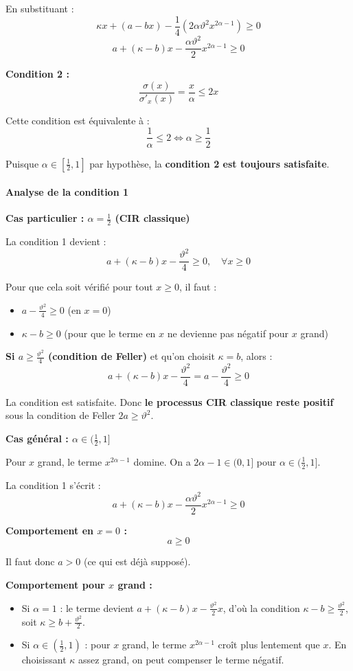 \documentclass[12pt,a4paper]{article}
\theoremstyle{definition}
\theoremstyle{remark}
\begin{document}
En substituant :
\[
\kappa x + (a - bx) - \frac{1}{4}(2\alpha\vartheta^2 x^{2\alpha-1}) \geq 0
\]
\[
a + (\kappa - b)x - \frac{\alpha\vartheta^2}{2}x^{2\alpha-1} \geq 0
\]

\textbf{Condition 2 :}
\[
\frac{\sigma(x)}{\sigma'_x(x)} = \frac{x}{\alpha} \leq 2x
\]

Cette condition est équivalente à :
\[
\frac{1}{\alpha} \leq 2 \iff \alpha \geq \frac{1}{2}
\]

Puisque $\alpha \in [\frac{1}{2}, 1]$ par hypothèse, la \textbf{condition 2 est toujours satisfaite}.

\paragraph{Analyse de la condition 1}

\textbf{Cas particulier : $\alpha = \frac{1}{2}$ (CIR classique)}

La condition 1 devient :
\[
a + (\kappa - b)x - \frac{\vartheta^2}{4} \geq 0, \quad \forall x \geq 0
\]

Pour que cela soit vérifié pour tout $x \geq 0$, il faut :
\begin{itemize}
\item $a - \frac{\vartheta^2}{4} \geq 0$ (en $x = 0$)
\item $\kappa - b \geq 0$ (pour que le terme en $x$ ne devienne pas négatif pour $x$ grand)
\end{itemize}

\textbf{Si $a \geq \frac{\vartheta^2}{4}$ (condition de Feller)} et qu'on choisit $\kappa = b$, alors :
\[
a + (\kappa - b)x - \frac{\vartheta^2}{4} = a - \frac{\vartheta^2}{4} \geq 0
\]

La condition est satisfaite. Donc \textbf{le processus CIR classique reste positif} sous la condition de Feller $2a \geq \vartheta^2$.

\textbf{Cas général : $\alpha \in (\frac{1}{2}, 1]$}

Pour $x$ grand, le terme $x^{2\alpha-1}$ domine. On a $2\alpha - 1 \in (0,1]$ pour $\alpha \in (\frac{1}{2}, 1]$.

La condition 1 s'écrit :
\[
a + (\kappa - b)x - \frac{\alpha\vartheta^2}{2}x^{2\alpha-1} \geq 0
\]

\textbf{Comportement en $x = 0$ :}
\[
a \geq 0
\]

Il faut donc $a > 0$ (ce qui est déjà supposé).

\textbf{Comportement pour $x$ grand :}
\begin{itemize}
\item Si $\alpha = 1$ : le terme devient $a + (\kappa - b)x - \frac{\vartheta^2}{2}x$, d'où la condition $\kappa - b \geq \frac{\vartheta^2}{2}$, soit $\kappa \geq b + \frac{\vartheta^2}{2}$.

\item Si $\alpha \in (\frac{1}{2}, 1)$ : pour $x$ grand, le terme $x^{2\alpha-1}$ croît plus lentement que $x$. En choisissant $\kappa$ assez grand, on peut compenser le terme négatif.
\end{itemize}
\end{document}
